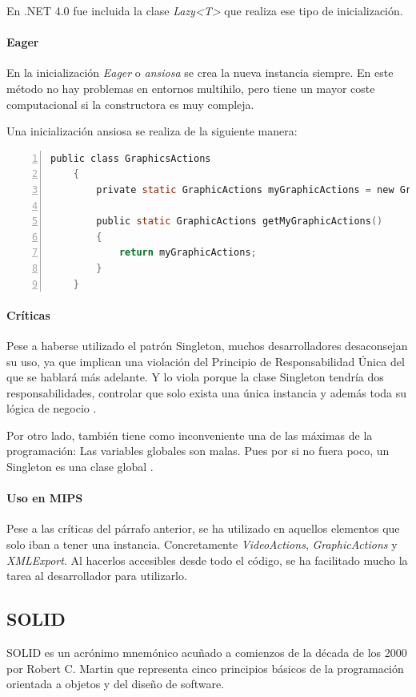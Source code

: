 En .NET 4.0 fue incluida la clase \emph{Lazy<T>} que realiza ese tipo de inicializaci\'on.

\paragraph{Eager} En la inicializaci\'on \emph{Eager} o \emph{ansiosa} se crea la nueva instancia siempre. En este m\'etodo no hay problemas
en entornos multihilo, pero tiene un mayor coste computacional si la constructora es muy compleja.

Una inicializaci\'on ansiosa se realiza de la siguiente manera:
\begin{lstlisting}[language=C, numbers=left, showspaces=false, breaklines=true, tabsize=2]
    public class GraphicsActions 
    {
        private static GraphicActions myGraphicActions = new GraphicActions();
        
        public static GraphicActions getMyGraphicActions()
        { 
            return myGraphicActions;
        }
    }
\end{lstlisting}

\paragraph{Cr\'iticas}Pese a haberse utilizado el patr\'on Singleton, muchos desarrolladores desaconsejan su uso, ya que implican
una violaci\'on del Principio de Responsabilidad \'Unica del que se hablar\'a m\'as adelante. Y lo viola porque
la clase Singleton tendr\'ia dos responsabilidades, controlar que solo exista una \'unica instancia y adem\'as
toda su l\'ogica de negocio \cite{Singleton:EVIL}.

Por otro lado, tambi\'en tiene como inconveniente una de las m\'aximas de la programaci\'on: Las variables globales
son malas. Pues por si no fuera poco, un Singleton es una clase global \cite{Singleton:EVIL}.

\paragraph{Uso en MIPS}
Pese a las cr\'iticas del p\'arrafo anterior, se ha utilizado en aquellos elementos que solo iban a tener
una instancia. Concretamente \emph{VideoActions}, \emph{GraphicActions} y \emph{XMLExport}. Al
hacerlos accesibles desde todo el c\'odigo, se ha facilitado mucho la tarea al desarrollador para utilizarlo.

\subsection{SOLID}
SOLID es un acr\'{o}nimo mnem\'{o}nico acu\~{n}ado a comienzos de la d\'{e}cada de los 2000 por 
Robert C. Martin \cite{SOLID:ADefinition}
que representa cinco principios b\'{a}sicos de la programaci\'{o}n orientada a objetos y del dise\~{n}o de software.


